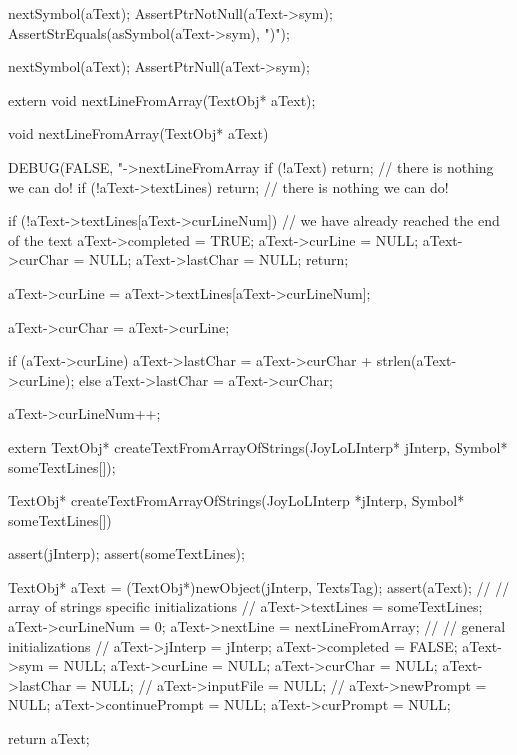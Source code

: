   nextSymbol(aText);
  AssertPtrNotNull(aText->sym);
  AssertStrEquals(asSymbol(aText->sym), ")");

  nextSymbol(aText);
  AssertPtrNull(aText->sym);
\stopCTest
\stopTestCase
\stopTestSuite


\startCHeader
extern void nextLineFromArray(TextObj* aText);
\stopCHeader
{}

\startCCode
void nextLineFromArray(TextObj* aText) {
  DEBUG(FALSE, "->nextLineFromArray %
  if (!aText) return;  // there is nothing we can do!
  if (!aText->textLines) return; // there is nothing we can do!

  if (!aText->textLines[aText->curLineNum]) {
    // we have already reached the end of the text
    aText->completed  = TRUE;
    aText->curLine    = NULL;
    aText->curChar    = NULL;
    aText->lastChar   = NULL;
    return;
  }

  aText->curLine  = aText->textLines[aText->curLineNum];

  aText->curChar  = aText->curLine;

  if (aText->curLine) {
    aText->lastChar = aText->curChar + strlen(aText->curLine);
  } else aText->lastChar = aText->curChar;

  aText->curLineNum++;
}
\stopCCode

\startCHeader
extern TextObj* createTextFromArrayOfStrings(JoyLoLInterp* jInterp,
                                             Symbol* someTextLines[]);
\stopCHeader

\startCCode
TextObj* createTextFromArrayOfStrings(JoyLoLInterp *jInterp,
                                      Symbol* someTextLines[]) {
  assert(jInterp);
  assert(someTextLines);
  
  TextObj* aText = (TextObj*)newObject(jInterp, TextsTag);
  assert(aText);
  //
  // array of strings specific initializations
  //
  aText->textLines  = someTextLines;
  aText->curLineNum = 0;
  aText->nextLine   = nextLineFromArray;
  //
  // general initializations
  //
  aText->jInterp    = jInterp;
  aText->completed  = FALSE;
  aText->sym        = NULL;
  aText->curLine    = NULL;
  aText->curChar    = NULL;
  aText->lastChar   = NULL;
  //
  aText->inputFile  = NULL;
  //
  aText->newPrompt       = NULL;
  aText->continuePrompt  = NULL;
  aText->curPrompt       = NULL;

  return aText;
}
\stopCCode

